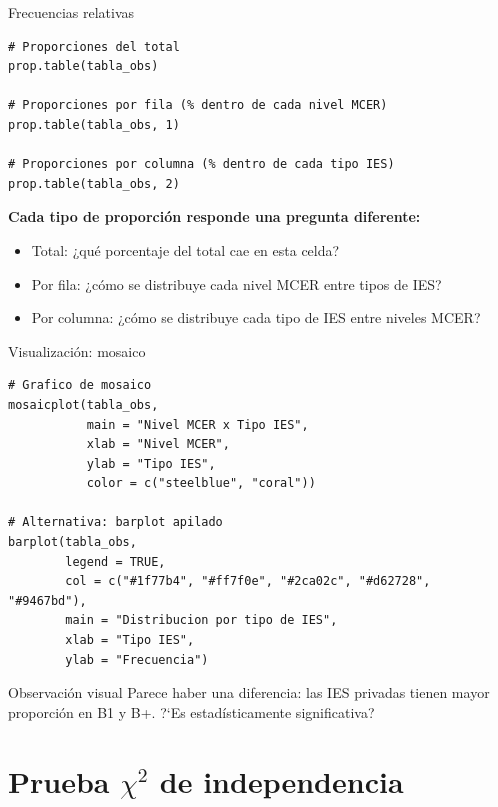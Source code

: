 \documentclass[aspectratio=169, 11pt]{beamer}
\begin{document}
\begin{frame}[fragile]{Frecuencias relativas}
\begin{lstlisting}
# Proporciones del total
prop.table(tabla_obs)

# Proporciones por fila (% dentro de cada nivel MCER)
prop.table(tabla_obs, 1)

# Proporciones por columna (% dentro de cada tipo IES)
prop.table(tabla_obs, 2)
\end{lstlisting}

\vspace{0.2cm}
\textbf{Cada tipo de proporción responde una pregunta diferente:}
\begin{itemize}
  \item Total: ¿qué porcentaje del total cae en esta celda?
  \item Por fila: ¿cómo se distribuye cada nivel MCER entre tipos de IES?
  \item Por columna: ¿cómo se distribuye cada tipo de IES entre niveles MCER?
\end{itemize}
\end{frame}

\begin{frame}[fragile]{Visualización: mosaico}
\begin{lstlisting}[basicstyle=\ttfamily\scriptsize]
# Grafico de mosaico
mosaicplot(tabla_obs,
           main = "Nivel MCER x Tipo IES",
           xlab = "Nivel MCER",
           ylab = "Tipo IES",
           color = c("steelblue", "coral"))

# Alternativa: barplot apilado
barplot(tabla_obs,
        legend = TRUE,
        col = c("#1f77b4", "#ff7f0e", "#2ca02c", "#d62728", "#9467bd"),
        main = "Distribucion por tipo de IES",
        xlab = "Tipo IES",
        ylab = "Frecuencia")
\end{lstlisting}

\begin{block}{Observaci\'on visual}
Parece haber una diferencia: las IES privadas tienen mayor proporci\'on en B1 y B+. ?`Es estad\'isticamente significativa?
\end{block}
\end{frame}

\section{Prueba $\chi^2$ de independencia}
\end{document}
